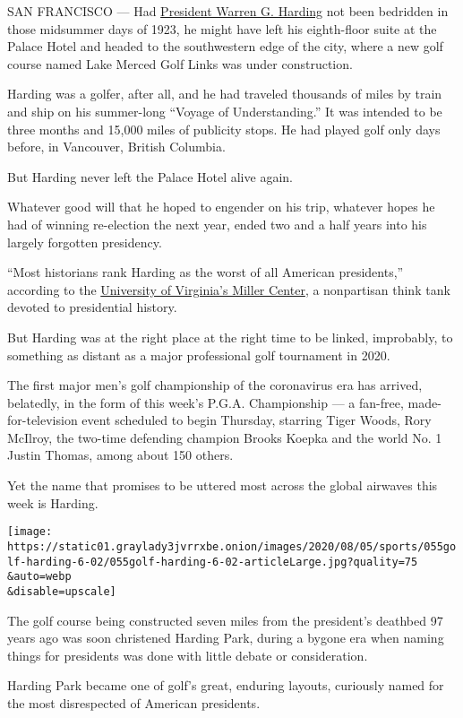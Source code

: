 SAN FRANCISCO --- Had
\href{https://www.whitehouse.gov/about-the-white-house/presidents/warren-g-harding/}{President
Warren G. Harding} not been bedridden in those midsummer days of 1923,
he might have left his eighth-floor suite at the Palace Hotel and headed
to the southwestern edge of the city, where a new golf course named Lake
Merced Golf Links was under construction.

Harding was a golfer, after all, and he had traveled thousands of miles
by train and ship on his summer-long ``Voyage of Understanding.'' It was
intended to be three months and 15,000 miles of publicity stops. He had
played golf only days before, in Vancouver, British Columbia.

But Harding never left the Palace Hotel alive again.

Whatever good will that he hoped to engender on his trip, whatever hopes
he had of winning re-election the next year, ended two and a half years
into his largely forgotten presidency.

``Most historians rank Harding as the worst of all American
presidents,'' according to the
\href{https://millercenter.org/about}{University of Virginia's Miller
Center}, a nonpartisan think tank devoted to presidential history.

But Harding was at the right place at the right time to be linked,
improbably, to something as distant as a major professional golf
tournament in 2020.

The first major men's golf championship of the coronavirus era has
arrived, belatedly, in the form of this week's P.G.A. Championship --- a
fan-free, made-for-television event scheduled to begin Thursday,
starring Tiger Woods, Rory McIlroy, the two-time defending champion
Brooks Koepka and the world No. 1 Justin Thomas, among about 150 others.

Yet the name that promises to be uttered most across the global airwaves
this week is Harding.

\texttt{[image: https://static01.graylady3jvrrxbe.onion/images/2020/08/05/sports/055golf-harding-6-02/055golf-harding-6-02-articleLarge.jpg?quality=75\\\&auto=webp\\\&disable=upscale]}

The golf course being constructed seven miles from the president's
deathbed 97 years ago was soon christened Harding Park, during a bygone
era when naming things for presidents was done with little debate or
consideration.

Harding Park became one of golf's great, enduring layouts, curiously
named for the most disrespected of American presidents.

